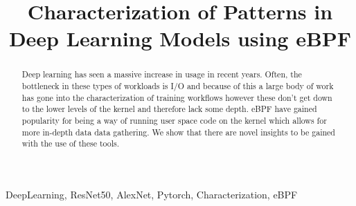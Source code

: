 \documentclass[conference]{IEEEtran}
\begin{document}
\title{Characterization of Patterns in Deep Learning Models using eBPF\\
}

\author{
	\and
	\and
}

\maketitle

\begin{abstract}
    Deep learning has seen a massive increase in usage in recent years. Often, the bottleneck in these types of workloads is I/O and because of this a large body of work has gone into 
    the characterization of training workflows however these don't get down to the lower levels of the kernel and therefore lack some depth. eBPF have gained popularity for being a way
    of running user space code on the kernel which allows for more in-depth data data gathering. We show that there are novel insights to be gained with the use of these tools.


\end{abstract}

\begin{IEEEkeywords}
     DeepLearning, ResNet50, AlexNet, Pytorch, Characterization, eBPF
\end{IEEEkeywords}
\end{document}
